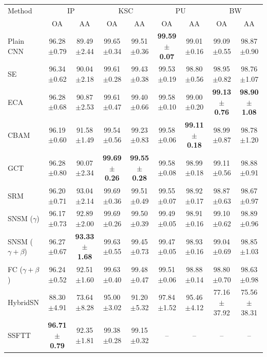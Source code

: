 \begin{tabular}{lcccccccc}
\toprule
Method & \multicolumn{2}{c}{IP} & \multicolumn{2}{c}{KSC} & \multicolumn{2}{c}{PU} & \multicolumn{2}{c}{BW} \\
 & OA & AA & OA & AA & OA & AA & OA & AA \\
\midrule
Plain CNN & 96.28$\pm$0.79 & 89.49$\pm$2.44 & 99.65$\pm$0.34 & 99.51$\pm$0.36 & \textbf{99.59$\pm$0.07} & 99.01$\pm$0.16 & 99.09$\pm$0.55 & 98.87$\pm$0.90 \\
SE & 96.34$\pm$0.62 & 90.04$\pm$2.18 & 99.61$\pm$0.28 & 99.43$\pm$0.38 & 99.53$\pm$0.19 & 98.80$\pm$0.56 & 98.95$\pm$0.82 & 98.76$\pm$1.07 \\
ECA & 96.28$\pm$0.68 & 90.87$\pm$2.53 & 99.61$\pm$0.47 & 99.40$\pm$0.66 & 99.58$\pm$0.10 & 99.00$\pm$0.20 & \textbf{99.13$\pm$0.76} & \textbf{98.90$\pm$1.08} \\
CBAM & 96.19$\pm$0.60 & 91.58$\pm$1.49 & 99.54$\pm$0.56 & 99.23$\pm$0.83 & 99.58$\pm$0.06 & \textbf{99.11$\pm$0.18} & 98.99$\pm$0.87 & 98.78$\pm$1.20 \\
GCT & 96.28$\pm$0.80 & 90.07$\pm$2.34 & \textbf{99.69$\pm$0.26} & \textbf{99.55$\pm$0.28} & 99.58$\pm$0.08 & 98.99$\pm$0.18 & 99.11$\pm$0.56 & 98.88$\pm$0.91 \\
SRM & 96.20$\pm$0.71 & 93.04$\pm$2.14 & 99.69$\pm$0.36 & 99.51$\pm$0.49 & 99.55$\pm$0.07 & 98.92$\pm$0.17 & 98.87$\pm$0.63 & 98.67$\pm$0.97 \\
SNSM ($\gamma$) & 96.17$\pm$0.73 & 92.89$\pm$2.00 & 99.69$\pm$0.26 & 99.50$\pm$0.39 & 99.49$\pm$0.05 & 98.91$\pm$0.16 & 99.10$\pm$0.62 & 98.89$\pm$0.96 \\
SNSM ($\gamma{+}\beta$) & 96.27$\pm$0.67 & \textbf{93.33$\pm$1.68} & 99.63$\pm$0.55 & 99.45$\pm$0.73 & 99.47$\pm$0.05 & 98.93$\pm$0.16 & 99.04$\pm$0.69 & 98.85$\pm$1.03 \\
\midrule
FC ($\gamma{+}\beta$) & 96.24$\pm$0.52 & 92.51$\pm$1.60 & 99.63$\pm$0.40 & 99.48$\pm$0.47 & 99.51$\pm$0.06 & 98.88$\pm$0.14 & 98.80$\pm$0.70 & 98.63$\pm$0.98 \\
HybridSN & 88.30$\pm$4.91 & 73.64$\pm$8.28 & 95.00$\pm$3.02 & 91.20$\pm$5.32 & 97.84$\pm$1.52 & 95.46$\pm$4.12 & 77.16$\pm$37.92 & 75.56$\pm$38.31 \\
SSFTT & \textbf{96.71$\pm$0.79} & 92.35$\pm$1.81 & 99.38$\pm$0.28 & 99.15$\pm$0.32 & -- & -- & -- & -- \\
\bottomrule
\end{tabular}
